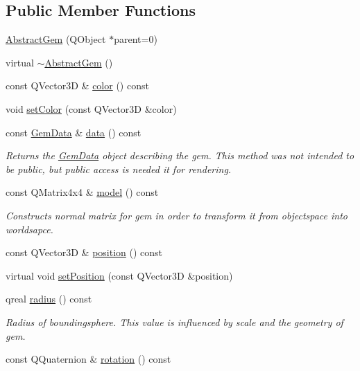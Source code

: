 \subsection*{Public Member Functions}
\begin{DoxyCompactItemize}
\item 
\hyperlink{class_abstract_gem_a489d032060a42a9a8475309105fc585d}{Abstract\+Gem} (Q\+Object $\ast$parent=0)
\item 
virtual \hyperlink{class_abstract_gem_aafe5a4fa8c354ee562602d7b9ff1656b}{$\sim$\+Abstract\+Gem} ()
\item 
const Q\+Vector3\+D \& \hyperlink{class_abstract_gem_abb92885bcf86f43f069c9a0ef203d770}{color} () const 
\item 
void \hyperlink{class_abstract_gem_ace63416f61034b73969b5a89e3913e6d}{set\+Color} (const Q\+Vector3\+D \&color)
\item 
const \hyperlink{class_gem_data}{Gem\+Data} \& \hyperlink{class_abstract_gem_ac23fb212f3cca79b345f82e19f8c12d5}{data} () const 
\begin{DoxyCompactList}\small\item\em Returns the \hyperlink{class_gem_data}{Gem\+Data} object describing the gem.  This method was not intended to be public, but public access is needed it for rendering. \end{DoxyCompactList}\item 
const Q\+Matrix4x4 \& \hyperlink{class_abstract_gem_a89f90d07bc8a780f053b3c6a5720aeed}{model} () const 
\begin{DoxyCompactList}\small\item\em Constructs normal matrix for gem in order to transform it from objectspace into worldsapce. \end{DoxyCompactList}\item 
const Q\+Vector3\+D \& \hyperlink{class_abstract_gem_a404114854610011363f6d7800985b718}{position} () const 
\item 
virtual void \hyperlink{class_abstract_gem_aaf11fa4b522dc334ebed4f2d031a3e2b}{set\+Position} (const Q\+Vector3\+D \&position)
\item 
qreal \hyperlink{class_abstract_gem_a628481ed4ebff7b282524a003d4392c2}{radius} () const 
\begin{DoxyCompactList}\small\item\em Radius of boundingsphere. This value is influenced by scale and the geometry of gem. \end{DoxyCompactList}\item 
const Q\+Quaternion \& \hyperlink{class_abstract_gem_a4fc9d6ed418b73ec2539e063ebfa70c1}{rotation} () const 

\end{DoxyCompactItemize}
